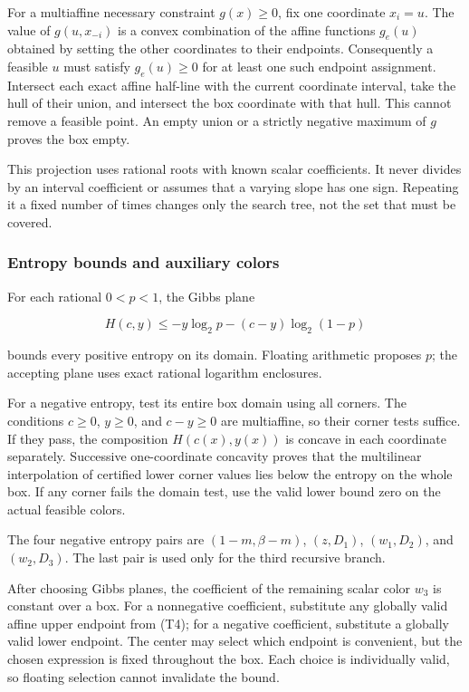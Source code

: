 For a multiaffine necessary constraint \(g(x)\ge0\), fix one coordinate \(x_i=u\). The value of \(g(u,x_{-i})\) is a convex combination of the affine functions \(g_e(u)\) obtained by setting the other coordinates to their endpoints. Consequently a feasible \(u\) must satisfy \(g_e(u)\ge0\) for at least one such endpoint assignment. Intersect each exact affine half-line with the current coordinate interval, take the hull of their union, and intersect the box coordinate with that hull. This cannot remove a feasible point. An empty union or a strictly negative maximum of \(g\) proves the box empty.

This projection uses rational roots with known scalar coefficients. It never divides by an interval coefficient or assumes that a varying slope has one sign. Repeating it a fixed number of times changes only the search tree, not the set that must be covered.

\hypertarget{af-a9ec399514-entropy-bounds-and-auxiliary-colors}{%
\subsubsection{Entropy bounds and auxiliary colors}\label{af-a9ec399514-entropy-bounds-and-auxiliary-colors}}

For each rational \(0<p<1\), the Gibbs plane

\[
H(c,y)\le -y\log_2p-(c-y)\log_2(1-p)
\tag{T11}
\]

bounds every positive entropy on its domain. Floating arithmetic proposes \(p\); the accepting plane uses exact rational logarithm enclosures.

For a negative entropy, test its entire box domain using all corners. The conditions \(c\ge0\), \(y\ge0\), and \(c-y\ge0\) are multiaffine, so their corner tests suffice. If they pass, the composition \(H(c(x),y(x))\) is concave in each coordinate separately. Successive one-coordinate concavity proves that the multilinear interpolation of certified lower corner values lies below the entropy on the whole box. If any corner fails the domain test, use the valid lower bound zero on the actual feasible colors.

The four negative entropy pairs are \((1-m,\beta-m)\), \((z,D_1)\), \((w_1,D_2)\), and \((w_2,D_3)\). The last pair is used only for the third recursive branch.

After choosing Gibbs planes, the coefficient of the remaining scalar color \(w_3\) is constant over a box. For a nonnegative coefficient, substitute any globally valid affine upper endpoint from (T4); for a negative coefficient, substitute a globally valid lower endpoint. The center may select which endpoint is convenient, but the chosen expression is fixed throughout the box. Each choice is individually valid, so floating selection cannot invalidate the bound.

